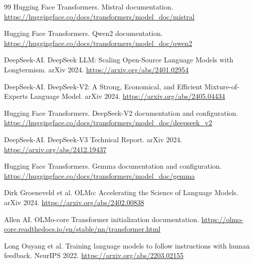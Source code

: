 \documentclass[UTF8,a4paper,11pt]{ctexart}
\begin{document}
\begin{thebibliography}{99}
Hugging Face Transformers.
\newblock Mistral documentation.
\newblock \url{https://huggingface.co/docs/transformers/model_doc/mistral}

Hugging Face Transformers.
\newblock Qwen2 documentation.
\newblock \url{https://huggingface.co/docs/transformers/model_doc/qwen2}

DeepSeek-AI.
\newblock DeepSeek LLM: Scaling Open-Source Language Models with Longtermism.
\newblock arXiv 2024.
\newblock \url{https://arxiv.org/abs/2401.02954}

DeepSeek-AI.
\newblock DeepSeek-V2: A Strong, Economical, and Efficient Mixture-of-Experts Language Model.
\newblock arXiv 2024.
\newblock \url{https://arxiv.org/abs/2405.04434}

Hugging Face Transformers.
\newblock DeepSeek-V2 documentation and configuration.
\newblock \url{https://huggingface.co/docs/transformers/model_doc/deepseek_v2}

DeepSeek-AI.
\newblock DeepSeek-V3 Technical Report.
\newblock arXiv 2024.
\newblock \url{https://arxiv.org/abs/2412.19437}

Hugging Face Transformers.
\newblock Gemma documentation and configuration.
\newblock \url{https://huggingface.co/docs/transformers/model_doc/gemma}

Dirk Groeneveld et al.
\newblock OLMo: Accelerating the Science of Language Models.
\newblock arXiv 2024.
\newblock \url{https://arxiv.org/abs/2402.00838}

Allen AI.
\newblock OLMo-core Transformer initialization documentation.
\newblock \url{https://olmo-core.readthedocs.io/en/stable/nn/transformer.html}

Long Ouyang et al.
\newblock Training language models to follow instructions with human feedback.
\newblock NeurIPS 2022.
\newblock \url{https://arxiv.org/abs/2203.02155}

\end{thebibliography}
\end{document}
